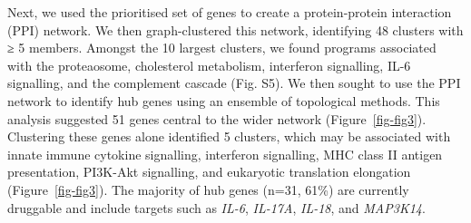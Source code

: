 \documentclass[
  11,
  a4paper,
]{article}
\begin{document}
Next, we used the prioritised set of genes to create a protein-protein
interaction (PPI) network. We then graph-clustered this network,
identifying 48 clusters with ≥ 5 members. Amongst the 10 largest
clusters, we found programs associated with the proteaosome, cholesterol
metabolism, interferon signalling, IL-6 signalling, and the complement
cascade (Fig. S5). We then sought to use the PPI network to identify hub
genes using an ensemble of topological methods. This analysis suggested
51 genes central to the wider network (Figure~\ref{fig-fig3}).
Clustering these genes alone identified 5 clusters, which may be
associated with innate immune cytokine signalling, interferon
signalling, MHC class II antigen presentation, PI3K-Akt signalling, and
eukaryotic translation elongation (Figure~\ref{fig-fig3}). The majority
of hub genes (n=31, 61\%) are currently druggable and include targets
such as \emph{IL-6}, \emph{IL-17A}, \emph{IL-18}, and \emph{MAP3K14}.
\end{document}
